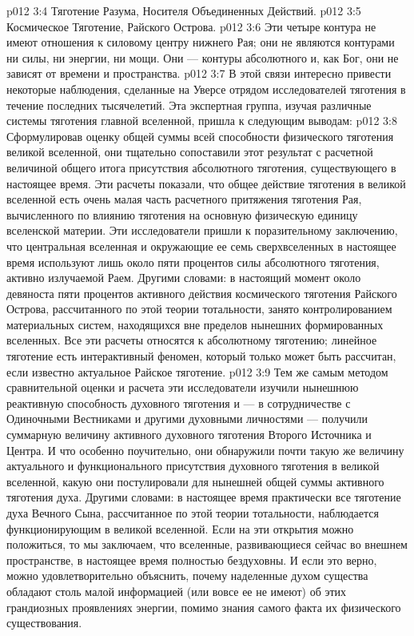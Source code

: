 \vs p012 3:4 \bibnobreakspace Тяготение Разума, Носителя Объединенных Действий.
\vs p012 3:5 \bibnobreakspace Космическое Тяготение, Райского Острова.
\vs p012 3:6 \pc Эти четыре контура не имеют отношения к силовому центру нижнего Рая; они не являются контурами ни силы, ни энергии, ни мощи. Они --- контуры абсолютного  и, как Бог, они не зависят от времени и пространства.
\vs p012 3:7 В этой связи интересно привести некоторые наблюдения, сделанные на Уверсе отрядом исследователей тяготения в течение последних тысячелетий. Эта экспертная группа, изучая различные системы тяготения главной вселенной, пришла к следующим выводам:
\vs p012 3:8 \pc {}\bibnobreakspace {} Сформулировав оценку общей суммы всей способности физического тяготения великой вселенной, они тщательно сопоставили этот результат с расчетной величиной общего итога присутствия абсолютного тяготения, существующего в настоящее время. Эти расчеты показали, что общее действие тяготения в великой вселенной есть очень малая часть расчетного притяжения тяготения Рая, вычисленного по влиянию тяготения на основную физическую единицу вселенской материи. Эти исследователи пришли к поразительному заключению, что центральная вселенная и окружающие ее семь сверхвселенных в настоящее время используют лишь около пяти процентов силы абсолютного тяготения, активно излучаемой Раем. Другими словами: в настоящий момент около девяноста пяти процентов активного действия космического тяготения Райского Острова, рассчитанного по этой теории тотальности, занято контролированием материальных систем, находящихся вне пределов нынешних формированных вселенных. Все эти расчеты относятся к абсолютному тяготению; линейное тяготение есть интерактивный феномен, который только может быть рассчитан, если известно актуальное Райское тяготение.
\vs p012 3:9 \pc {}\bibnobreakspace {} Тем же самым методом сравнительной оценки и расчета эти исследователи изучили нынешнюю реактивную способность духовного тяготения и --- в сотрудничестве с Одиночными Вестниками и другими духовными личностями --- получили суммарную величину активного духовного тяготения Второго Источника и Центра. И что особенно поучительно, они обнаружили почти такую же величину актуального и функционального присутствия духовного тяготения в великой вселенной, какую они постулировали для нынешней общей суммы активного тяготения духа. Другими словами: в настоящее время практически все тяготение духа Вечного Сына, рассчитанное по этой теории тотальности, наблюдается функционирующим в великой вселенной. Если на эти открытия можно положиться, то мы заключаем, что вселенные, развивающиеся сейчас во внешнем пространстве, в настоящее время полностью бездуховны. И если это верно, можно удовлетворительно объяснить, почему наделенные духом существа обладают столь малой информацией (или вовсе ее не имеют) об этих грандиозных проявлениях энергии, помимо знания самого факта их физического существования.
